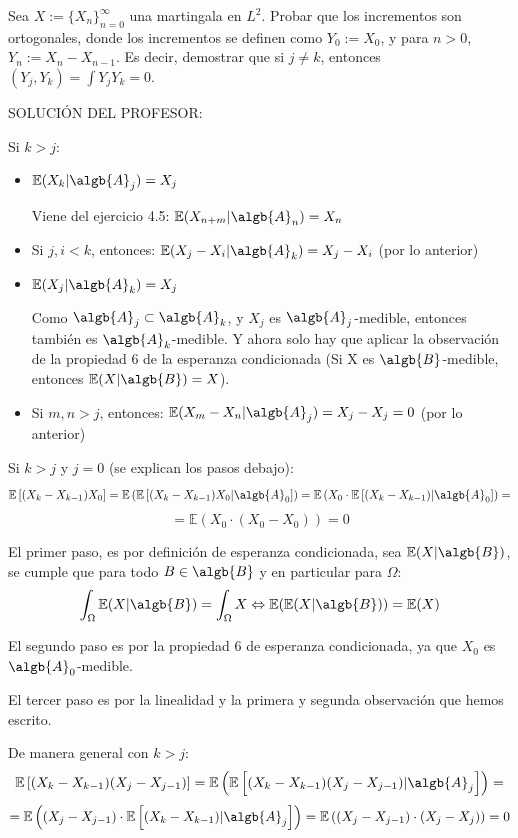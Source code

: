 \begin{problem}[2] Sea $X := \{X_n\}_{n=0}^{\infty}$   una martingala en $L^2$. Probar que los incrementos 
son ortogonales, donde los incrementos se definen como $Y_0 := X_0$, y 
para $n > 0$, $Y_n := X_n - X_{n-1}$. Es decir, demostrar que si $j\ne k$, entonces
$(Y_j, Y_k) = \int Y_j Y_k = 0$. 
\solution

\begin{expla}


\end{expla}

SOLUCIÓN DEL PROFESOR:

\obs Si $k>j$:
\begin{itemize}
\item $\mathbb{E}(X_k|\algb{A}_j) = X_j$

Viene del ejercicio 4.5: $\mathbb{E}(X_{n+m}|\algb{A}_n)=X_n$

\item Si $j,i < k$, entonces: $\mathbb{E}(X_j-X_i|\algb{A}_k)=X_j-X_i$  (por lo anterior)

\item $\mathbb{E}(X_j|\algb{A}_k) = X_j$

Como $\algb{A}_j \subset \algb{A}_k$, y $X_j$ es $\algb{A}_j$-medible, entonces también es $\algb{A}_k$-medible. Y ahora solo hay que aplicar la observación de la propiedad 6 de la esperanza condicionada (Si X es $\algb{B}$-medible, entonces $\mathbb{E}(X|\algb{B})=X$). 

\item Si $m,n > j$, entonces: $\mathbb{E}(X_m-X_n|\algb{A}_j)=X_j-X_j=0$  (por lo anterior)
\end{itemize}

Si $k>j$ y $j=0$ (se explican los pasos debajo):
\[
\mathbb{E}\left[(X_k-X_{k-1})X_0\right] = \mathbb{E}\left( \mathbb{E}\left[(X_k-X_{k-1})X_0|\algb{A}_0\right]\right)= \mathbb{E}\left(X_0 \cdot \mathbb{E}\left[(X_k-X_{k-1})|\algb{A}_0\right]\right) =
\]
\[
= \mathbb{E}\left(X_0 \cdot (X_0-X_0)\right)  = 0
\]

El primer paso, es por definición de esperanza condicionada, sea $\mathbb{E}(X|\algb{B})$, se cumple que para todo $B \in \algb{B}$ y en particular para $\Omega$:
\[
\int_{\Omega}\mathbb{E}(X|\algb{B}) = \int_{\Omega}X \Leftrightarrow \mathbb{E}(\mathbb{E}(X|\algb{B})) = \mathbb{E}(X)
\]

El segundo paso es por la propiedad 6 de esperanza condicionada, ya que $X_0$ es $\algb{A}_0$-medible.

El tercer paso es por la linealidad y la primera y segunda observación que hemos escrito.


De manera general con $k>j$:
\[
\mathbb{E}\left[(X_k-X_{k-1})(X_j-X_{j-1})\right] = \mathbb{E}\left( \mathbb{E}\left[(X_k-X_{k-1})(X_j-X_{j-1})|\algb{A}_j\right]\right) =
\]
\[
= \mathbb{E}\left((X_j-X_{j-1}) \cdot \mathbb{E}\left[(X_k-X_{k-1})|\algb{A}_j\right]\right)= \mathbb{E}\left((X_j-X_{j-1}) \cdot (X_j-X_j)\right)  = 0
\]



\end{problem}

